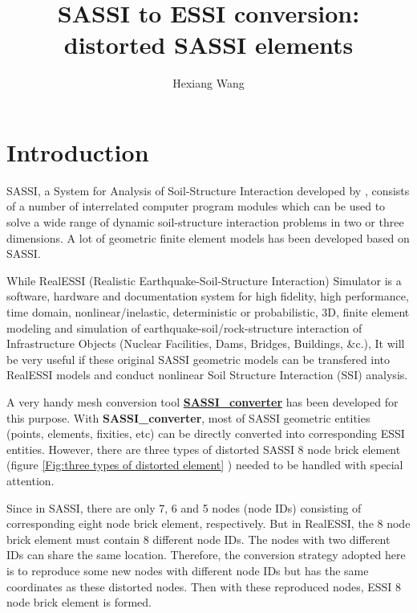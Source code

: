 \documentclass{article}
\begin{document}
\title{SASSI to ESSI conversion: distorted SASSI elements}
\author{Hexiang Wang}
\maketitle

\section{Introduction}\label{sec: introduction}

SASSI, a System for Analysis of Soil-Structure Interaction developed by \citet{Ostadan2007b}, consists of a number of interrelated computer program modules which can be used to solve a wide range of dynamic soil-structure interaction problems in two or three dimensions.
%
A lot of geometric finite element models has been developed based on SASSI. 

%
While RealESSI (Realistic Earthquake-Soil-Structure Interaction) Simulator is a software, hardware and documentation system for high fidelity, high performance, time domain, nonlinear/inelastic, deterministic or probabilistic, 3D, finite element modeling and simulation of earthquake-soil/rock-structure interaction of Infrastructure Objects (Nuclear Facilities, Dams, Bridges, Buildings, \&c.),
%
It will be very useful if these original SASSI geometric models can be transfered into RealESSI models and conduct nonlinear Soil Structure Interaction (SSI) analysis.  

%
A very handy mesh conversion tool \href{https://github.com/hexiang6666/SASSI_converter}{\textbf{SASSI\_converter}} has been developed for this purpose.   
%
With \textbf{SASSI\_converter}, most of SASSI geometric entities (points, elements, fixities, etc) can be directly converted into corresponding ESSI entities.  
%
However, there are three types of distorted SASSI 8 node brick element (figure \ref{Fig:three types of distorted element} ) needed to be handled with special attention. 

Since in SASSI, there are only 7, 6 and 5 nodes (node IDs) consisting of corresponding eight node brick element, respectively.
%
But in RealESSI, the 8 node brick element must contain 8 different node IDs. 
%
The nodes with two different IDs can share the same location. 
%
Therefore, the conversion strategy adopted here is to reproduce some new nodes with different node IDs but has the same coordinates as these distorted nodes. 
%
Then with these reproduced nodes, ESSI 8 node brick element is formed.      
\end{document}
